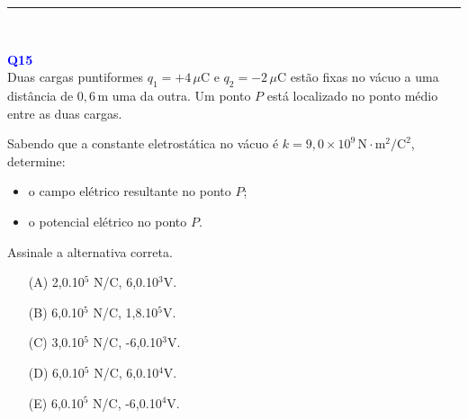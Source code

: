 \documentclass[a4paper,12pt]{article}
\begin{document}
\noindent\rule{\linewidth}{0.6pt}\\

\begin{flushleft}
\textbf{\textcolor{blue}{\Large Q15}}\\
Duas cargas puntiformes \( q_1 = +4\,\mu\text{C} \) e \( q_2 = -2\,\mu\text{C} \) estão fixas no vácuo a uma distância de \( 0{,}6\,\text{m} \) 
uma da outra. Um ponto \( P \) está localizado no ponto médio entre as duas cargas.

Sabendo que a constante eletrostática no vácuo é \( k = 9{,}0 \times 10^9\,\text{N} \cdot \text{m}^2/\text{C}^2 \), determine:

\begin{itemize}
    \item \colorbox{green!20}{o campo elétrico resultante no ponto \( P \);}
    \item \colorbox{green!20}{o potencial elétrico no ponto \( P \).}
\end{itemize}

Assinale a alternativa correta.
\begin{itemize}
\item[(A)] 2,0.10$^{5}$ N/C, 6,0.10$^{3}$V.
\item[(B)] 6,0.10$^{5}$ N/C, 1,8.10$^{5}$V.
\item[(C)] 3,0.10$^{5}$ N/C, -6,0.10$^{3}$V.
\item[(D)] 6,0.10$^{5}$ N/C, 6,0.10$^{4}$V.
\item[(E)] 6,0.10$^{5}$ N/C, -6,0.10$^{4}$V.
\end{itemize}

\begin{center}
\end{center}
\end{flushleft}
\end{document}
